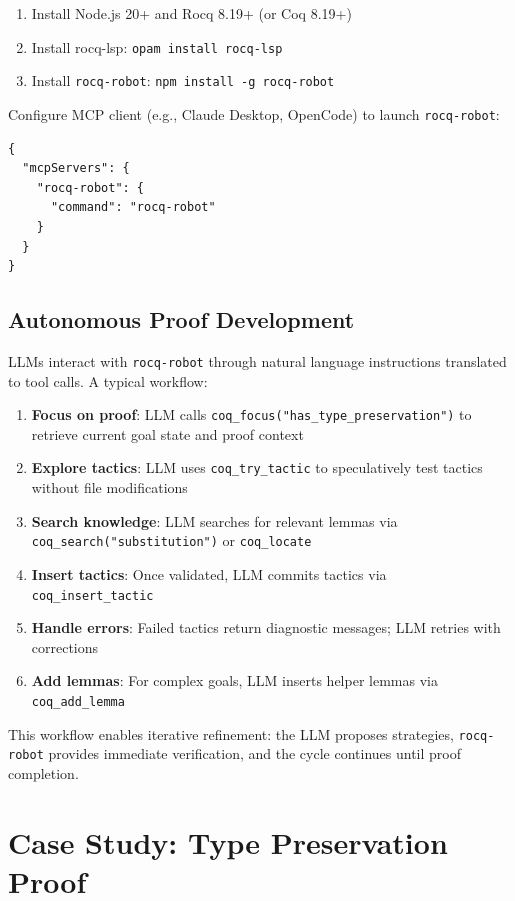 \documentclass[11pt,a4paper]{article}
\newcommand{\tool}{\texttt{rocq-robot}\xspace}
\begin{document}
\begin{enumerate}
\item Install Node.js 20+ and Rocq 8.19+ (or Coq 8.19+)
\item Install rocq-lsp: \texttt{opam install rocq-lsp}
\item Install \tool: \texttt{npm install -g rocq-robot}
\end{enumerate}

Configure MCP client (e.g., Claude Desktop, OpenCode) to launch \tool:

\begin{lstlisting}[basicstyle=\footnotesize\ttfamily]
{
  "mcpServers": {
    "rocq-robot": {
      "command": "rocq-robot"
    }
  }
}
\end{lstlisting}

\subsection{Autonomous Proof Development}

LLMs interact with \tool through natural language instructions translated to tool calls. A typical workflow:

\begin{enumerate}
\item \textbf{Focus on proof}: LLM calls \texttt{coq\_focus("has\_type\_preservation")} to retrieve current goal state and proof context
\item \textbf{Explore tactics}: LLM uses \texttt{coq\_try\_tactic} to speculatively test tactics without file modifications
\item \textbf{Search knowledge}: LLM searches for relevant lemmas via \texttt{coq\_search("substitution")} or \texttt{coq\_locate}
\item \textbf{Insert tactics}: Once validated, LLM commits tactics via \texttt{coq\_insert\_tactic}
\item \textbf{Handle errors}: Failed tactics return diagnostic messages; LLM retries with corrections
\item \textbf{Add lemmas}: For complex goals, LLM inserts helper lemmas via \texttt{coq\_add\_lemma}
\end{enumerate}

This workflow enables iterative refinement: the LLM proposes strategies, \tool provides immediate verification, and the cycle continues until proof completion.

\section{Case Study: Type Preservation Proof}
\end{document}

